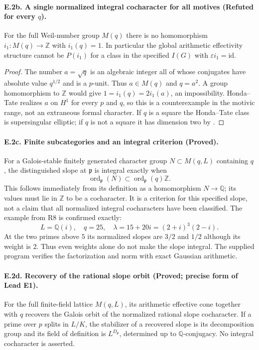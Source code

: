\paragraph{E.2b. A single normalized integral cocharacter for all motives
(Refuted for every $q$).}
\label{E2b}
For the full Weil-number group $M(q)$ there is no homomorphism
$i_1:M(q)\to\mathbb Z$ with $i_1(q)=1$. In particular the global
arithmetic effectivity structure cannot be $P(i_1)$ for a class in
the specified $I(G)$ with $\varepsilon i_1=\mathrm{id}$.

\begin{proof}
The number $a=\sqrt q$ is an algebraic integer all of whose conjugates
have absolute value $q^{1/2}$ and is a $p$-unit. Thus $a\in M(q)$
and $q=a^2$. A group homomorphism to $\mathbb Z$ would give
$1=i_1(q)=2i_1(a)$, an impossibility. Honda--Tate realizes $a$ on
$H^1$ for every $p$ and $q$, so this is a counterexample in the
motivic range, not an extraneous formal character. If $q$ is a
square the Honda--Tate class is supersingular elliptic; if $q$ is
not a square it has dimension two by
\citet[Th\'eor\`eme~1 and examples, pp.~96--97]{Tate1971}.
\end{proof}

\paragraph{E.2c. Finite subcategories and an integral criterion (Proved).}
\label{E2c}
For a Galois-stable finitely generated character group $N\subset
M(q,L)$ containing $q$, the distinguished slope at $\mathfrak p$
is integral exactly when
\[
 \operatorname{ord}_{\mathfrak p}(N)
       \subset\operatorname{ord}_{\mathfrak p}(q)\mathbb Z.
\]
This follows immediately from its definition as a homomorphism
$N\to\mathbb Q$; its values must lie in $\mathbb Z$ to be a
cocharacter. It is a criterion for this specified slope, not a
claim that all normalized integral cocharacters have been classified.
The example from R8 is confirmed exactly:
\[
 L=\mathbb Q(i),\quad q=25,\quad
 \lambda=15+20i=(2+i)^3(2-i).
\]
At the two primes above $5$ its normalized slopes are $3/2$ and
$1/2$ although its weight is $2$. Thus even weights alone do not
make the slope integral. The supplied program verifies the
factorization and norm with exact Gaussian arithmetic.

\paragraph{E.2d. Recovery of the rational slope orbit (Proved;
precise form of Lead E1).}
\label{E2d}
For the full finite-field lattice $M(q,L)$, its arithmetic effective
cone together with $q$ recovers the Galois orbit of the normalized
rational slope cocharacter. If a prime over $p$ splits in $L/K$,
the stabilizer of a recovered slope is its decomposition group and
its field of definition is $L^{D_{\mathfrak p}}$, determined up to
$\mathbb Q$-conjugacy. No integral cocharacter is asserted.

